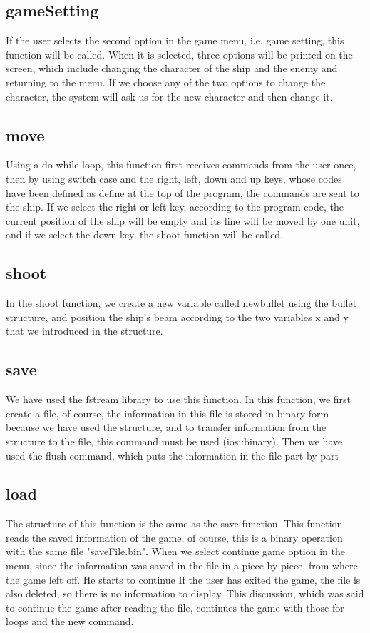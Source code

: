 \documentclass[12pt,a4paper]{article}
\begin{document}
	\subsection{gameSetting}
	If the user selects the second option in the game menu, i.e. game setting, this function will be called. When it is selected, 
	three options will be printed on the screen, which include changing the character of the ship and the enemy and returning to the menu. If we choose any of the two options to change the character, 
	the system will ask us for the new character and then change it.
	\subsection{move}
	Using a do while loop, this function first receives commands from the user once, then by using switch case and the right, left, down and up keys,
	whose codes have been defined as define at the top of the program, the commands are sent to the ship. If we select the right or left key,
	according to the program code, the current position of the ship will be empty and its line will be moved by one unit, and if we select the down key,
	the shoot function will be called.
	\subsection{shoot}
	In the shoot function, we create a new variable called newbullet using the bullet structure, 
	and position the ship's beam according to the two variables x and y that we introduced in the structure.
	\subsection{save}
	We have used the fstream library to use this function.
    In this function, we first create a file, of course, the information in this file is stored in binary form because we have used the structure, and to transfer information from the structure to the file, this command must be used (ios::binary).
    Then we have used the flush command, which puts the information in the file part by part
	\subsection{load}
    The structure of this function is the same as the save function. This function reads the saved information of the game, of course, this is a binary operation with the same file "saveFile.bin".
    When we select continue game option in the menu, since the information was saved in the file in a piece by piece, from where the game left off.
    He starts to continue
    If the user has exited the game, the file is also deleted, so there is no information to display.
    This discussion, which was said to continue the game after reading the file, continues the game with those for loops and the new command.
	\newpage
	\setcounter{section}{0}
\end{document}
